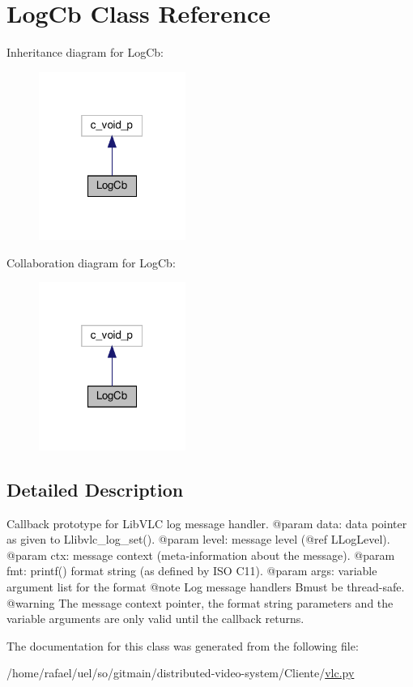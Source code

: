 \hypertarget{classvlc_1_1_log_cb}{}\section{Log\+Cb Class Reference}
\label{classvlc_1_1_log_cb}


Inheritance diagram for Log\+Cb\+:
\nopagebreak
\begin{figure}[H]
\begin{center}
\leavevmode
\includegraphics[width=136pt]{classvlc_1_1_log_cb__inherit__graph}
\end{center}
\end{figure}


Collaboration diagram for Log\+Cb\+:
\nopagebreak
\begin{figure}[H]
\begin{center}
\leavevmode
\includegraphics[width=136pt]{classvlc_1_1_log_cb__coll__graph}
\end{center}
\end{figure}


\subsection{Detailed Description}
\begin{DoxyVerb}Callback prototype for LibVLC log message handler.
@param data: data pointer as given to L{libvlc_log_set}().
@param level: message level (@ref L{LogLevel}).
@param ctx: message context (meta-information about the message).
@param fmt: printf() format string (as defined by ISO C11).
@param args: variable argument list for the format @note Log message handlers B{must} be thread-safe. @warning The message context pointer, the format string parameters and the variable arguments are only valid until the callback returns.
\end{DoxyVerb}
 

The documentation for this class was generated from the following file\+:\begin{DoxyCompactItemize}
\item 
/home/rafael/uel/so/gitmain/distributed-\/video-\/system/\+Cliente/\hyperlink{vlc_8py}{vlc.\+py}\end{DoxyCompactItemize}
